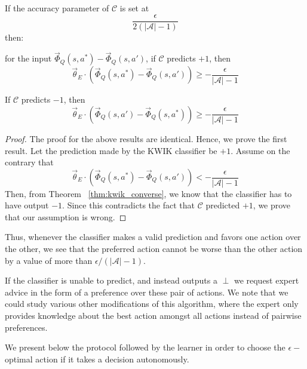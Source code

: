  
\begin{thm}
\label{thm:kwik_condition}
If the accuracy parameter of $\mathcal{C}$ is set at
\[
\frac{\epsilon}{2(|\mathcal{A}|-1)}
\]
then:

 for the input $\vec{\Phi}_Q(s,a^*) - \vec{\Phi}_Q(s,a')$, if $\mathcal{C}$ predicts $+1$, then 
\begin{equation}
\vec{\theta}_E \cdot (\vec{\Phi}_Q(s,a^*) - \vec{\Phi}_Q(s,a')) \geq - \frac{\epsilon}{|\mathcal{A}|-1}
\end{equation}

If $\mathcal{C}$ predicts $-1$, then
\begin{equation}
\vec{\theta}_E \cdot (\vec{\Phi}_Q(s,a') - \vec{\Phi}_Q(s,a^*)) \geq - \frac{\epsilon}{|\mathcal{A}|-1}
\end{equation}

\end{thm}

\begin{proof}
The proof for the above results are identical. Hence, we prove the first result. Let the prediction made by the KWIK classifier be $+1$. Assume on the contrary that 
\[
\vec{\theta}_E \cdot (\vec{\Phi}_Q(s,a^*) - \vec{\Phi}_Q(s,a')) < - \frac{\epsilon}{|\mathcal{A}|-1}
\]
Then, from Theorem ~\ref{thm:kwik_converse}, we know that the classifier has to have output $-1$.  Since this contradicts the fact that $\mathcal{C}$ predicted $+1$, we prove that our assumption is wrong. 
\end{proof}

Thus, whenever the classifier makes a valid prediction and favors one action over the other, we see that the preferred action cannot be worse than the  other action by a value of more than $\epsilon/(|\mathcal{A}|-1)$. 


If the classifier is unable to predict, and instead outputs a $\perp$ we request expert advice in the form of a preference over these pair of actions. We note that we could study various other modifications of this algorithm, where the expert only provides knowledge about the best action amongst all actions instead of pairwise preferences. 


We present below the protocol followed by the learner in order to choose the $\epsilon-$optimal action 
if it takes a decision autonomously. 


